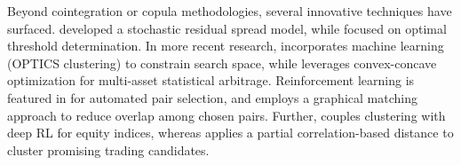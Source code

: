 Beyond cointegration or copula methodologies, several innovative techniques have surfaced. 
\cite{do2006new} developed a stochastic residual spread model, while \cite{Zeng2014} focused on optimal threshold determination. 
In more recent research, \cite{Sarmento2020} incorporates machine learning (OPTICS clustering) to constrain search space, while \cite{Johansson2024} leverages convex-concave optimization for multi-asset statistical arbitrage. Reinforcement learning is featured in \cite{Han2023} for automated pair selection, and \cite{qureshi2024pairs} employs a graphical matching approach to reduce overlap among chosen pairs. Further, \cite{Roychoudhury2023} couples clustering with deep RL for equity indices, whereas \cite{Rotondi2025} applies a partial correlation-based distance to cluster promising trading candidates.
%

